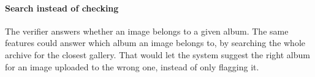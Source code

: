 \documentclass[conference]{IEEEtran}
\begin{document}
\paragraph{Search instead of checking} The verifier answers whether an image belongs to a given album. The same features could answer which album an image belongs to, by searching the whole archive for the closest gallery. That would let the system suggest the right album for an image uploaded to the wrong one, instead of only flagging it.



\end{document}
